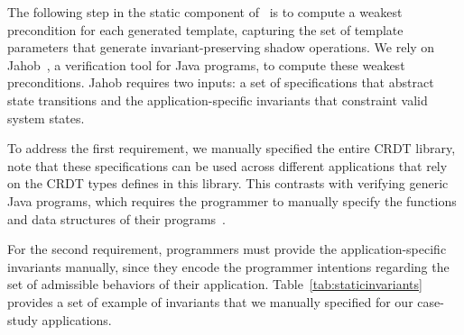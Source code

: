 
The following step in the static component of \tool\ is to compute a weakest precondition
for each generated template, capturing the set of template parameters that generate
invariant-preserving shadow operations.
We rely on Jahob~\cite{Kuncak2007Jahob}, a verification tool
for Java programs, to compute these weakest preconditions.
Jahob requires two inputs: a set of
specifications that abstract state transitions and the application-specific invariants
that constraint valid system states.

To address the first requirement,
we manually specified the entire CRDT library, note that these specifications can be used across
different applications that rely on the CRDT types defines in this library. 
This contrasts with verifying generic Java programs, which requires the programmer to manually
specify the functions and data structures of their programs~\cite{Kuncak2007Jahob}.

For the second requirement, programmers must provide the application-specific invariants manually, since they encode the programmer intentions regarding the set of admissible behaviors of their application.
Table~\ref{tab:staticinvariants}
provides a set of example of invariants that we manually specified for our case-study applications.


